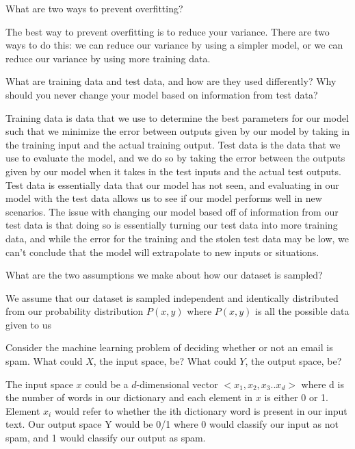 \begin{problem}[2]
  What are two ways to prevent overfitting?
\end{problem}
\begin{solution}
  The best way to prevent overfitting is to reduce your variance. There are two ways to do this: we can reduce our variance by using a simpler model, or we can reduce our variance by using more training data.
\end{solution}

\begin{problem}[2]
  What are training data and test data, and how are they used differently? Why should you never change your model based on information from test data?
\end{problem}
\begin{solution}
  Training data is data that we use to determine the best parameters for our model such that we minimize the error between outputs given by our model by taking in the training input and the actual training output. Test data is the data that we use to evaluate the model, and we do so by taking the error between the outputs given by our model when it takes in the test inputs and the actual test outputs. Test data is essentially data that our model has not seen, and evaluating in our model with the test data allows us to see if our model performs well in new scenarios. The issue with changing our model based off of information from our test data is that doing so is essentially turning our test data into more training data, and while the error for the training and the stolen test data may be low, we can't conclude that the model will extrapolate to new inputs or situations.
\end{solution}

\begin{problem}[2]
  What are the two assumptions we make about how our dataset is sampled?
\end{problem}
\begin{solution}
  We assume that our dataset is sampled independent and identically distributed from our probability distribution $P(x,y)$ where $P(x,y)$ is all the possible data given to us 
\end{solution}

\begin{problem}[2]
  Consider the machine learning problem of deciding whether or not an email is spam. What could $X$, the input space, be? What could $Y$, the output space, be?
\end{problem}
\begin{solution}
  The input space $x$ could be a $d$-dimensional vector $<x_1,x_2,x_3..x_d>$ where d is the number of words in our dictionary and each element in $x$ is either 0 or 1. Element $x_i$ would refer to whether the ith dictionary word is present in our input text. Our output space Y would be 0/1 where 0 would classify our input as not spam, and 1 would classify our output as spam.
\end{solution}

